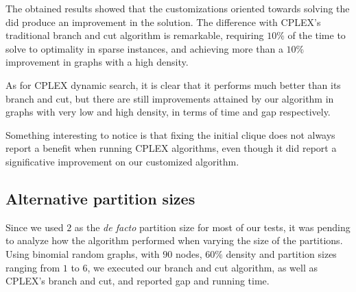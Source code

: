 The obtained results showed that the customizations oriented towards solving the \PCP{} did produce an improvement in the solution. The difference with \textsc{CPLEX}'s traditional branch and cut algorithm is remarkable, requiring $10\%$ of the time to solve to optimality in sparse instances, and achieving more than a $10\%$ improvement in graphs with a high density.

As for \textsc{CPLEX} dynamic search, it is clear that it performs much better than its branch and cut, but there are still improvements attained by our algorithm in graphs with very low and high density, in terms of time and gap respectively.

Something interesting to notice is that fixing the initial clique does not always report a benefit when running \textsc{CPLEX} algorithms, even though it did report a significative improvement on our customized algorithm.

\subsection{Alternative partition sizes}

Since we used $2$ as the \textit{de facto} partition size for most of our tests, it was pending to analyze how the algorithm performed when varying the size of the partitions. Using binomial random graphs, with $90$ nodes, $60\%$ density and partition sizes ranging from $1$ to $6$, we executed our branch and cut algorithm, as well as \textsc{CPLEX}'s branch and cut, and reported gap and running time.



